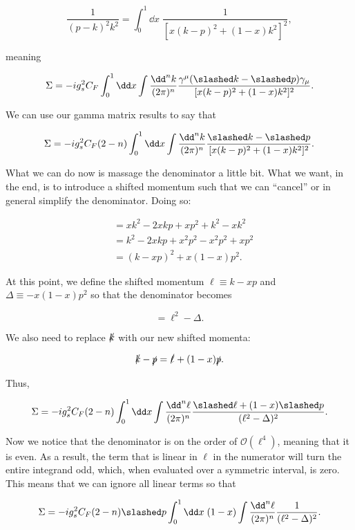 \documentclass[titlepage]{article}
\begin{document}
\begin{equation}
  \frac{1}{(p-k)^2k^2} = \int_0^1 \dd x \; \frac{1}{[x(k-p)^2 + (1-x)k^2]^2},
\end{equation}

meaning

\begin{equation}
  \Sigma = -ig_s^2 C_F \int_0^1 \dd x \int \frac{\dd^nk}{(2\pi)^n} \frac{\gamma^\mu(\ksl - \psl)\gamma_\mu}{[x(k-p)^2 + (1-x)k^2]^2}.
\end{equation}

We can use our gamma matrix results to say that

\begin{equation}
  \Sigma = -ig_s^2 C_F (2-n) \int_0^1 \dd x \int \frac{\dd^nk}{(2\pi)^n} \frac{\ksl - \psl}{[x(k-p)^2 + (1-x)k^2]^2}.
\end{equation}

What we can do now is massage the denominator a little bit. What we want, in the end, is to introduce a shifted momentum such that we can ``cancel'' or in general simplify the denominator. Doing so:

\begin{align}
  &= xk^2 - 2xkp + xp^2 + k^2 - xk^2 \\
  &= k^2 - 2xkp + x^2p^2 - x^2p^2 + xp^2 \\
  &= (k-xp)^2 + x(1-x)p^2.
\end{align}

At this point, we define the shifted momentum $\ell \equiv k-xp$ and $\Delta \equiv -x(1-x)p^2$ so that the denominator becomes

\begin{equation}
  = \ell^2 - \Delta.
\end{equation}

We also need to replace $\slashed{k}$ with our new shifted momenta:

\begin{equation}
  \slashed{k} - \slashed{p} = \slashed{\ell} + (1-x)\slashed{p}.
\end{equation}

Thus,

\begin{equation}
  \Sigma = -ig_s^2 C_F (2-n) \int_0^1 \dd x \int \frac{\dd^n\ell}{(2\pi)^n} \frac{\lsl + (1-x)\psl}{(\ell^2 - \Delta)^2}.
\end{equation}

Now we notice that the denominator is on the order of $\mathcal{O}(\ell^4)$, meaning that it is even. As a result, the term that is linear in $\ell$ in the numerator will turn the entire integrand odd, which, when evaluated over a symmetric interval, is zero. This means that we can ignore all linear terms so that

\begin{equation}
  \Sigma = -ig_s^2 C_F (2-n) \psl \int_0^1 \dd x \; (1-x) \int \frac{\dd^n\ell}{(2\pi)^n} \frac{1}{(\ell^2 - \Delta)^2}.
\end{equation}
\end{document}
